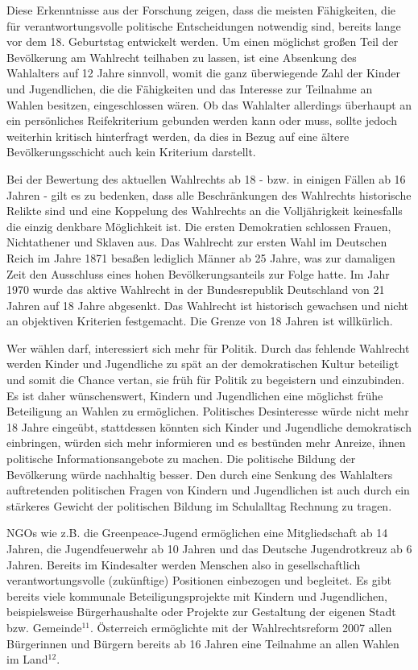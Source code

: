 {Diese Erkenntnisse aus der Forschung zeigen, dass die meisten Fähigkeiten, die für verantwortungsvolle politische Entscheidungen notwendig sind, bereits lange vor dem 18. Geburtstag entwickelt werden. Um einen möglichst großen Teil der Bevölkerung am Wahlrecht teilhaben zu lassen, ist eine Absenkung des Wahlalters auf 12 Jahre sinnvoll, womit die ganz überwiegende Zahl der Kinder und Jugendlichen, die die Fähigkeiten und das Interesse zur Teilnahme an Wahlen besitzen, eingeschlossen wären. Ob das Wahlalter allerdings überhaupt an ein persönliches Reifekriterium gebunden werden kann oder muss, sollte jedoch weiterhin kritisch hinterfragt werden, da dies in Bezug auf eine ältere Bevölkerungsschicht auch kein Kriterium darstellt.

Bei der Bewertung des aktuellen Wahlrechts ab 18 - bzw. in einigen Fällen ab 16 Jahren - gilt es zu bedenken, dass alle Beschränkungen des Wahlrechts historische Relikte sind und eine Koppelung des Wahlrechts an die Volljährigkeit keinesfalls die einzig denkbare Möglichkeit ist. Die ersten {\Gu}Demokratien{\Go} schlossen Frauen, Nichtathener und Sklaven aus. Das Wahlrecht zur ersten Wahl im Deutschen Reich im Jahre 1871 besaßen lediglich Männer ab 25 Jahre, was zur damaligen Zeit den Ausschluss eines hohen Bevölkerungsanteils zur Folge hatte. Im Jahr 1970 wurde das aktive Wahlrecht in der Bundesrepublik Deutschland von 21 Jahren auf 18 Jahre abgesenkt. Das Wahlrecht ist historisch gewachsen und nicht an objektiven Kriterien festgemacht. Die Grenze von 18 Jahren ist willkürlich.

Wer wählen darf, interessiert sich mehr für Politik. Durch das fehlende Wahlrecht werden Kinder und Jugendliche zu spät an der demokratischen Kultur beteiligt und somit die Chance vertan, sie früh für Politik zu begeistern und einzubinden. Es ist daher wünschenswert, Kindern und Jugendlichen eine möglichst frühe Beteiligung an Wahlen zu ermöglichen. Politisches Desinteresse würde nicht mehr 18 Jahre eingeübt, stattdessen könnten sich Kinder und Jugendliche demokratisch einbringen, würden sich mehr informieren und es bestünden mehr Anreize, ihnen politische Informationsangebote zu machen. Die politische Bildung der Bevölkerung würde nachhaltig besser. Den durch eine Senkung des Wahlalters auftretenden politischen Fragen von Kindern und Jugendlichen ist auch durch ein stärkeres Gewicht der politischen Bildung im Schulalltag Rechnung zu tragen.

NGOs wie z.B. die Greenpeace-Jugend ermöglichen eine Mitgliedschaft ab 14 Jahren, die Jugendfeuerwehr ab 10 Jahren und das Deutsche Jugendrotkreuz ab 6 Jahren. Bereits im Kindesalter werden Menschen also in gesellschaftlich verantwortungsvolle (zukünftige) Positionen einbezogen und begleitet. Es gibt bereits viele kommunale Beteiligungsprojekte mit Kindern und Jugendlichen, beispielsweise Bürgerhaushalte oder Projekte zur Gestaltung der eigenen Stadt bzw. Gemeinde$^{11}$. Österreich ermöglichte mit der Wahlrechtsreform 2007 allen Bürgerinnen und Bürgern bereits ab 16 Jahren eine Teilnahme an allen Wahlen im Land$^{12}$.

}
